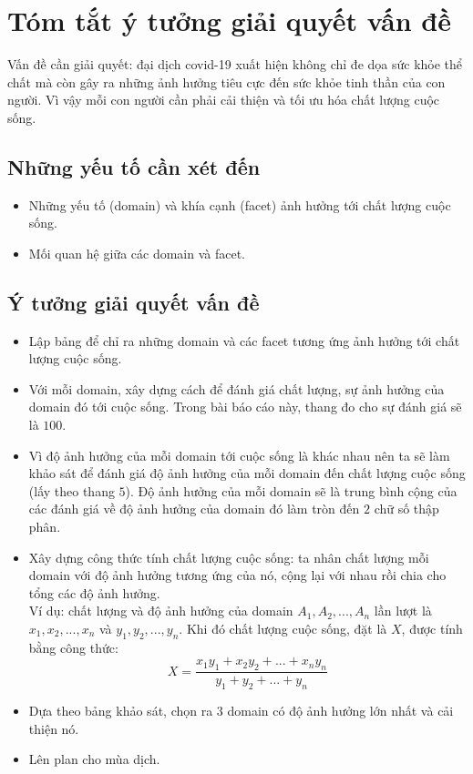 \section{Tóm tắt ý tưởng giải quyết vấn đề}
Vấn đề cần giải quyết: đại dịch covid-19 xuất hiện không chỉ đe dọa sức khỏe thể chất mà còn gây ra những ảnh hưởng tiêu cực đến sức khỏe tinh thần của con người. Vì vậy mỗi con người cần phải cải thiện và tối ưu hóa chất lượng cuộc sống.
\subsection{Những yếu tố cần xét đến}
\begin{itemize}
    \item Những yếu tố (domain) và khía cạnh (facet) ảnh hưởng tới chất lượng cuộc sống.
    \item Mối quan hệ giữa các domain và facet.
\end{itemize}
\subsection{Ý tưởng giải quyết vấn đề}
\begin{itemize}
    \item Lập bảng để chỉ ra những domain và các facet tương ứng ảnh hưởng tới chất lượng cuộc sống.
    \item Với mỗi domain, xây dựng cách để đánh giá chất lượng, sự ảnh hưởng của domain đó tới cuộc sống. Trong bài báo cáo này, thang đo cho sự đánh giá sẽ là $100$.
    \item Vì độ ảnh hưởng của mỗi domain tới cuộc sống là khác nhau nên ta sẽ làm khảo sát để đánh giá độ ảnh hưởng của mỗi domain đến chất lượng cuộc sống (lấy theo thang $5$). Độ ảnh hưởng của mỗi domain sẽ là trung bình cộng của các đánh giá về độ ảnh hưởng của domain đó làm tròn đến $2$ chữ số thập phân.
    \item Xây dựng công thức tính chất lượng cuộc sống: ta nhân chất lượng mỗi domain với độ ảnh hưởng tương ứng của nó, cộng lại với nhau rồi chia cho tổng các độ ảnh hưởng.\\
    Ví dụ: chất lượng và độ ảnh hưởng của domain $A_1, A_2,..., A_n$ lần lượt là $x_1, x_2,..., x_n$ và $y_1, y_2,..., y_n$. Khi đó chất lượng cuộc sống, đặt là $X$, được tính bằng công thức:
    $$X = \frac{x_1y_1 + x_2y_2 + ... + x_ny_n}{y_1 + y_2 + ... + y_n}$$
    \item Dựa theo bảng khảo sát, chọn ra $3$ domain có độ ảnh hưởng lớn nhất và cải thiện nó.
    \item Lên plan cho mùa dịch.
\end{itemize}
